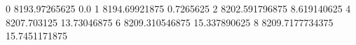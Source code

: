 0 8193.97265625 0.0
1 8194.69921875 0.7265625
2 8202.591796875 8.619140625
4 8207.703125 13.73046875
6 8209.310546875 15.337890625
8 8209.7177734375 15.7451171875
